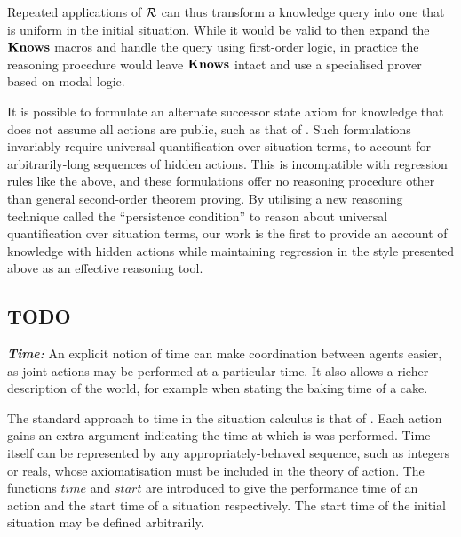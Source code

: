 Repeated applications of $\mathcal{R}$ can thus transform a knowledge query
into one that is uniform in the initial situation. While it would
be valid to then expand the $\mathbf{Knows}$ macros and handle the query
using first-order logic, in practice the reasoning procedure would
leave $\mathbf{Knows}$ intact and use a specialised prover based on modal
logic.

It is possible to formulate an alternate successor state axiom for
knowledge that does not assume all actions are public, such as that
of \cite{Lesperance99sitcalc_approach}. Such formulations invariably
require universal quantification over situation terms, to account
for arbitrarily-long sequences of hidden actions. This is incompatible
with regression rules like the above, and these formulations offer
no reasoning procedure other than general second-order theorem proving.
By utilising a new reasoning technique called the {}``persistence
condition'' to reason about universal quantification over situation
terms, our work is the first to provide an account of knowledge with
hidden actions while maintaining regression in the style presented
above as an effective reasoning tool.


\subsection{TODO}

\textbf{\emph{Time:}} An explicit notion of time can make coordination
between agents easier, as joint actions may be performed at a particular
time. It also allows a richer description of the world, for example
when stating the baking time of a cake.

The standard approach to time in the situation calculus is that of
\cite{reiter96sc_nat_conc,pinto94temporal}. Each action gains an
extra argument indicating the time at which is was performed. Time
itself can be represented by any appropriately-behaved sequence, such
as integers or reals, whose axiomatisation must be included in the
theory of action. The functions $time$ and $start$ are introduced
to give the performance time of an action and the start time of a
situation respectively. The start time of the initial situation may
be defined arbitrarily.

